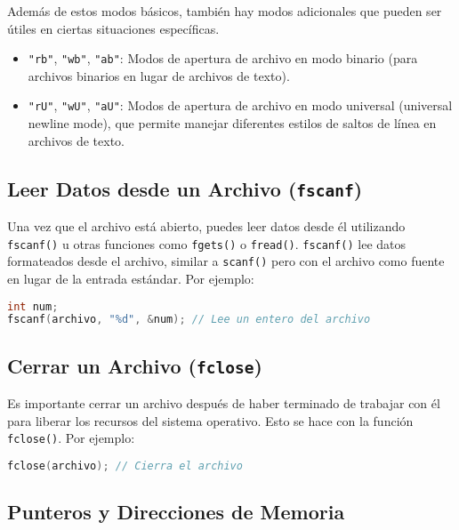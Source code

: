 Además de estos modos básicos, también hay modos adicionales que pueden ser útiles en ciertas situaciones específicas.

\begin{itemize}[label=--,leftmargin=*]
    \item \texttt{"rb"}, \texttt{"wb"}, \texttt{"ab"}: Modos de apertura de archivo en modo binario (para archivos binarios en lugar de archivos de texto).
    
    \item \texttt{"rU"}, \texttt{"wU"}, \texttt{"aU"}: Modos de apertura de archivo en modo universal (universal newline mode), que permite manejar diferentes estilos de saltos de línea en archivos de texto.
\end{itemize}

\subsection{Leer Datos desde un Archivo (\texttt{fscanf})}

Una vez que el archivo está abierto, puedes leer datos desde él utilizando \texttt{fscanf()} u otras funciones como \texttt{fgets()} o \texttt{fread()}. \texttt{fscanf()} lee datos formateados desde el archivo, similar a \texttt{scanf()} pero con el archivo como fuente en lugar de la entrada estándar. Por ejemplo:

\begin{lstlisting}[language=C]
int num;
fscanf(archivo, "%d", &num); // Lee un entero del archivo
\end{lstlisting}

\subsection{Cerrar un Archivo (\texttt{fclose})}

Es importante cerrar un archivo después de haber terminado de trabajar con él para liberar los recursos del sistema operativo. Esto se hace con la función \texttt{fclose()}. Por ejemplo:

\begin{lstlisting}[language=C]
fclose(archivo); // Cierra el archivo
\end{lstlisting}

\subsection{Punteros y Direcciones de Memoria}

